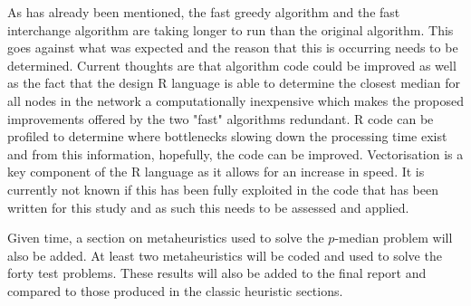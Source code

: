 \documentclass[11pt]{article}
\newcommand{\np}{\newpage}
\begin{document}
	As has already been mentioned, the fast greedy algorithm and the fast interchange algorithm are taking longer to run than the original algorithm.  This goes against what was expected and the reason that this is occurring needs to be determined.  Current thoughts are that algorithm code could be improved as well as the fact that the design R language is able to determine the closest median for all nodes in the network a computationally inexpensive which makes the proposed improvements offered by the two "fast" algorithms redundant.  R code can be profiled to determine where bottlenecks slowing down the processing time exist and from this information, hopefully, the code can be improved.  Vectorisation is a key component of the R language as it allows for an increase in speed.  It is currently not known if this has been fully exploited in the code that has been written for this study and as such this needs to be assessed and applied.
	
	Given time, a section on metaheuristics used to solve the $p$-median problem will also be added.  At least two metaheuristics will be coded and used to solve the forty test problems.  These results will also be added to the final report and compared to those produced in the classic heuristic sections.
		
		
	\np
	
	
	\np

	\printindex[terms]
	\printindex[authors]
	
\end{document}
